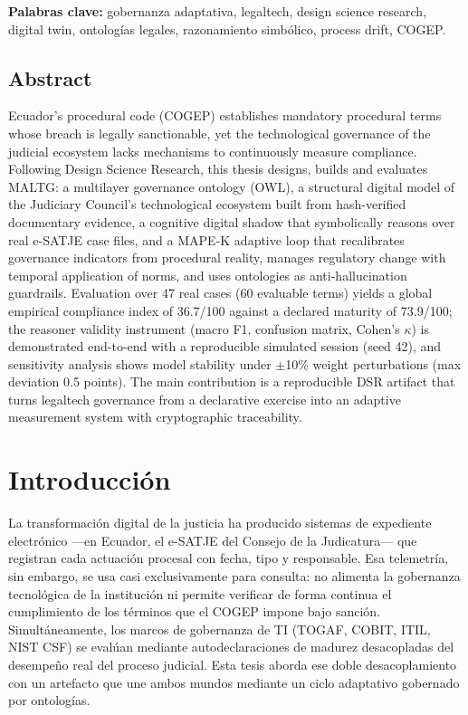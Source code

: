 \documentclass[a4paper,openany,12pt]{book}
\begin{document}
\textbf{Palabras clave:} gobernanza adaptativa, legaltech, design science research, digital twin, ontologías legales, razonamiento simbólico, process drift, COGEP.
\cleardoublepage

\section*{Abstract}
Ecuador's procedural code (COGEP) establishes mandatory procedural terms whose breach is legally sanctionable, yet the technological governance of the judicial ecosystem lacks mechanisms to continuously measure compliance. Following Design Science Research, this thesis designs, builds and evaluates MALTG: a multilayer governance ontology (OWL), a structural digital model of the Judiciary Council's technological ecosystem built from hash-verified documentary evidence, a cognitive digital shadow that symbolically reasons over real e-SATJE case files, and a MAPE-K adaptive loop that recalibrates governance indicators from procedural reality, manages regulatory change with temporal application of norms, and uses ontologies as anti-hallucination guardrails. Evaluation over 47 real cases (60 evaluable terms) yields a global empirical compliance index of 36.7/100 against a declared maturity of 73.9/100; the reasoner validity instrument (macro F1, confusion matrix, Cohen's $\kappa$) is demonstrated end-to-end with a reproducible simulated session (seed 42), and sensitivity analysis shows model stability under $\pm$10\% weight perturbations (max deviation 0.5 points). The main contribution is a reproducible DSR artifact that turns legaltech governance from a declarative exercise into an adaptive measurement system with cryptographic traceability.
\cleardoublepage

\tableofcontents
\listoffigures
\listoftables
\listofalgorithms
\mainmatter

\chapter{Introducción}
La transformación digital de la justicia ha producido sistemas de expediente electrónico ---en Ecuador, el e-SATJE del Consejo de la Judicatura--- que registran cada actuación procesal con fecha, tipo y responsable. Esa telemetría, sin embargo, se usa casi exclusivamente para consulta: no alimenta la gobernanza tecnológica de la institución ni permite verificar de forma continua el cumplimiento de los términos que el COGEP impone bajo sanción. Simultáneamente, los marcos de gobernanza de TI (TOGAF, COBIT, ITIL, NIST CSF) se evalúan mediante autodeclaraciones de madurez desacopladas del desempeño real del proceso judicial. Esta tesis aborda ese doble desacoplamiento con un artefacto que une ambos mundos mediante un ciclo adaptativo gobernado por ontologías.
\end{document}
